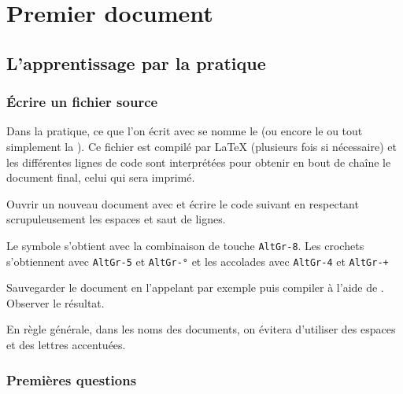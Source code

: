\renewcommand\MaCouleur{RawSienna}
\chapter{Premier document}
\thispagestyle{empty}

\section{L'apprentissage par la pratique}
\subsection{\'Ecrire un fichier source}

Dans la pratique, ce que l'on écrit avec \texstudio se nomme le  (ou encore le  ou tout simplement la ). Ce fichier est compilé par \LaTeX{} (plusieurs fois si nécessaire) et les différentes lignes de code sont interprétées pour obtenir en bout de chaîne le document final, celui qui sera imprimé.\medskip

Ouvrir un nouveau document avec \texstudio et écrire le code suivant en respectant scrupuleusement les espaces et saut de lignes.

\begin{info}
    Le symbole \tbs s'obtient avec la combinaison de touche {\tt AltGr-8}. Les crochets s'obtiennent avec  {\tt AltGr-5} et  {\tt AltGr-°} et les accolades avec  {\tt AltGr-4} et  {\tt AltGr-+}
\end{info}\medskip


Sauvegarder le document en l'appelant par exemple  puis compiler à l'aide de . Observer le résultat.\medskip

\begin{info}
    En règle générale, dans les noms des documents, on évitera d'utiliser des espaces et des lettres accentuées.
\end{info}

\subsection{Premières questions}

